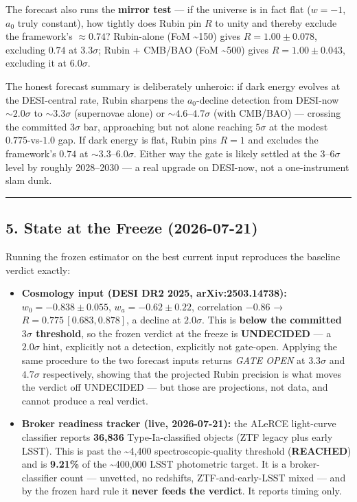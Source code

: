\documentclass[
]{article}
\begin{document}
The forecast also runs the \textbf{mirror test} --- if the universe is
in fact flat (\(w=-1\), \(a_0\) truly constant), how tightly does Rubin
pin \(R\) to unity and thereby exclude the framework's \(\approx0.74\)?
Rubin-alone (FoM \textasciitilde150) gives \(R=1.00\pm0.078\), excluding
\(0.74\) at \(3.3\sigma\); Rubin + CMB/BAO (FoM \textasciitilde500)
gives \(R=1.00\pm0.043\), excluding it at \(6.0\sigma\).

The honest forecast summary is deliberately unheroic: if dark energy
evolves at the DESI-central rate, Rubin sharpens the \(a_0\)-decline
detection from DESI-now \(\sim2.0\sigma\) to \(\sim3.3\sigma\)
(supernovae alone) or \(\sim4.6\)--\(4.7\sigma\) (with CMB/BAO) ---
crossing the committed \(3\sigma\) bar, approaching but not alone
reaching \(5\sigma\) at the modest \(0.775\)-vs-\(1.0\) gap. If dark
energy is flat, Rubin pins \(R=1\) and excludes the framework's \(0.74\)
at \(\sim3.3\)--\(6.0\sigma\). Either way the gate is likely settled at
the \(3\)--\(6\sigma\) level by roughly 2028--2030 --- a real upgrade on
DESI-now, not a one-instrument slam dunk.

\begin{center}\rule{0.5\linewidth}{0.5pt}\end{center}

\subsection{5. State at the Freeze
(2026-07-21)}\label{state-at-the-freeze-2026-07-21}

Running the frozen estimator on the best current input reproduces the
baseline verdict exactly:

\begin{itemize}
\item
  \textbf{Cosmology input (DESI DR2 2025, arXiv:2503.14738):}
  \(w_0=-0.838\pm0.055\), \(w_a=-0.62\pm0.22\), correlation \(-0.86\) →
  \(R=0.775\,[0.683,0.878]\), a decline at \(2.0\sigma\). This is
  \textbf{below the committed \(3\sigma\) threshold}, so the frozen
  verdict at the freeze is \textbf{UNDECIDED} --- a \(2.0\sigma\) hint,
  explicitly not a detection, explicitly not gate-open. Applying the
  same procedure to the two forecast inputs returns \emph{GATE OPEN} at
  \(3.3\sigma\) and \(4.7\sigma\) respectively, showing that the
  projected Rubin precision is what moves the verdict off UNDECIDED ---
  but those are projections, not data, and cannot produce a real
  verdict.
\item
  \textbf{Broker readiness tracker (live, 2026-07-21):} the ALeRCE
  light-curve classifier reports \textbf{36,836} Type-Ia-classified
  objects (ZTF legacy plus early LSST). This is past the
  \textasciitilde4,400 spectroscopic-quality threshold
  (\textbf{REACHED}) and is \textbf{9.21\%} of the
  \textasciitilde400,000 LSST photometric target. It is a
  broker-classifier count --- unvetted, no redshifts, ZTF-and-early-LSST
  mixed --- and by the frozen hard rule it \textbf{never feeds the
  verdict}. It reports timing only.
\end{itemize}
\end{document}

